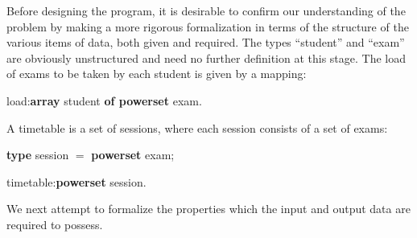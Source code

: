 Before designing the program, it is desirable to confirm our understanding of the problem by making a more rigorous formalization in terms of the structure of the various items of data, both given and required. The types ``student'' and ``exam'' are obviously unstructured and need no further definition at this stage. The load of exams to be taken by each student is given by a mapping:

\quad load:\textbf{array} student \textbf{of powerset} exam.

\noindent
A timetable is a set of sessions, where each session consists of a set of exams:

\quad \textbf{type} session $=$ \textbf{powerset} exam;

\quad timetable:\textbf{powerset} session.

\noindent
We next attempt to formalize the properties which the input and output data are required to possess.

